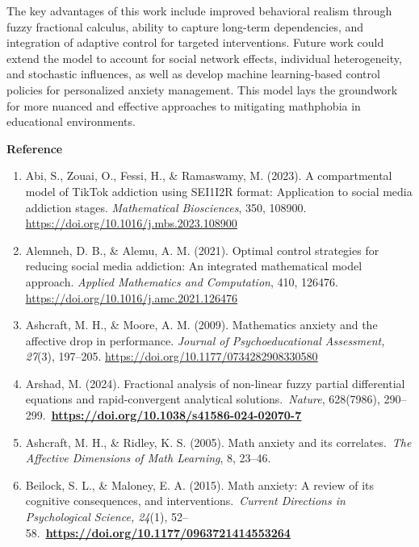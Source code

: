 \documentclass[
]{article}
\begin{document}
The key advantages of this work include improved behavioral realism through fuzzy fractional calculus, ability to capture long-term dependencies, and integration of adaptive control for targeted interventions. Future work could extend the model to account for social network effects, individual heterogeneity, and stochastic influences, as well as develop machine learning-based control policies for personalized anxiety management. This model lays the groundwork for more nuanced and effective approaches to mitigating mathphobia in educational environments.

\textbf{Reference}

\begin{enumerate}
\def\labelenumi{\arabic{enumi}.}
\item
  Abi, S., Zouai, O., Fessi, H., \& Ramaswamy, M. (2023). A compartmental model of TikTok addiction using SEI1I2R format: Application to social media addiction stages. \emph{Mathematical Biosciences}, 350, 108900. \href{https://doi.org/10.1016/j.mbs.2023.108900}{\ul{https://doi.org/10.1016/j.mbs.2023.108900}}
\item
  Alemneh, D. B., \& Alemu, A. M. (2021). Optimal control strategies for reducing social media addiction: An integrated mathematical model approach. \emph{Applied Mathematics and Computation}, 410, 126476. \href{https://doi.org/10.1016/j.amc.2021.126476}{\ul{https://doi.org/10.1016/j.amc.2021.126476}}
\item
  Ashcraft, M. H., \& Moore, A. M. (2009). Mathematics anxiety and the affective drop in performance. \emph{Journal of Psychoeducational Assessment, 27}(3), 197--205. \href{https://doi.org/10.1177/0734282908330580}{\ul{https://doi.org/10.1177/0734282908330580}}
\item
  Arshad, M. (2024). Fractional analysis of non-linear fuzzy partial differential equations and rapid-convergent analytical solutions.~\emph{Nature}, 628(7986), 290--299.~\href{https://doi.org/10.1038/s41586-024-02070-7}{\textbf{\ul{https://doi.org/10.1038/s41586-024-02070-7}}}
\item
  Ashcraft, M. H., \& Ridley, K. S. (2005). Math anxiety and its correlates.~\emph{The Affective Dimensions of Math Learning}, 8, 23--46.
\item
  Beilock, S. L., \& Maloney, E. A. (2015). Math anxiety: A review of its cognitive consequences, and interventions.~\emph{Current Directions in Psychological Science, 24}(1), 52--58.~\href{https://doi.org/10.1177/0963721414553264}{\textbf{\ul{https://doi.org/10.1177/0963721414553264}}}

\end{enumerate}
\end{document}
